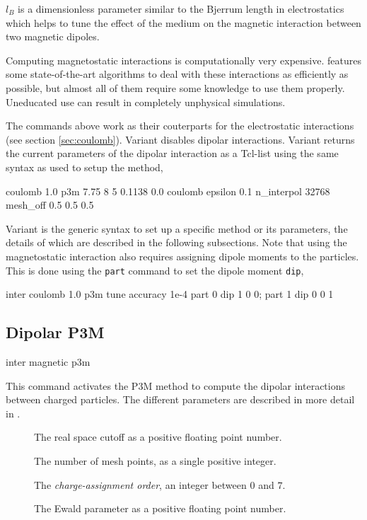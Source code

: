 $l_{B}$ is a dimensionless parameter similar to the Bjerrum length in
electrostatics which helps to tune the effect of the medium on the
magnetic interaction between two magnetic dipoles.

Computing magnetostatic interactions is computationally very
expensive.  \es{} features some state-of-the-art algorithms to deal
with these interactions as efficiently as possible, but almost all of
them require some knowledge to use them properly.  Uneducated use can
result in completely unphysical simulations.

The commands above work as their couterparts for the electrostatic
interactions (see section \vref{sec:coulomb}).  Variant 
disables dipolar interactions.  Variant  returns the
current parameters of the dipolar interaction as a Tcl-list using the
same syntax as used to setup the method, \eg
\begin{tclcode}
  {coulomb 1.0 p3m 7.75 8 5 0.1138 0.0}
  {coulomb epsilon 0.1 n_interpol 32768 mesh_off 0.5 0.5 0.5}
\end{tclcode}

Variant  is the generic syntax to set up a specific method
or its parameters, the details of which are described in the following
subsections.  Note that using the magnetostatic interaction also
requires assigning dipole moments to the particles.  This is done
using the \texttt{part} command to set the dipole moment \texttt{dip},
\eg
\begin{tclcode}
  inter coulomb 1.0 p3m tune accuracy 1e-4
  part 0 dip 1 0 0; part 1 dip 0 0 1
\end{tclcode}

\subsection{Dipolar P3M}

\begin{essyntax}
  inter magnetic  p3m 
     
  \begin{features}
  \end{features}
\end{essyntax}

This command activates the P3M method to compute the dipolar
interactions between charged particles.  The different parameters are
described in more detail in \cite{cerda08a}.
\begin{description}
\item[] The real space cutoff as a positive
  floating point number.
\item[] The number of mesh points, as a single positive
  integer.
\item[] The \emph{charge-assignment order}, an integer
  between $0$ and $7$.
\item[] The Ewald parameter as a positive floating point
  number.
\end{description}

